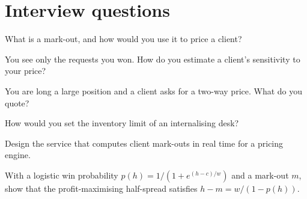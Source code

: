 \section{Interview questions}

\begin{interviewq}\label{iq:s2:flow-market-making-at-a-bank:1}
What is a mark-out, and how would you use it to price a client?
\end{interviewq}

\begin{interviewq}\label{iq:s2:flow-market-making-at-a-bank:2}
You see only the requests you won. How do you estimate a client's sensitivity to your price?
\end{interviewq}

\begin{interviewq}\label{iq:s2:flow-market-making-at-a-bank:3}
You are long a large position and a client asks for a two-way price. What do you quote?
\end{interviewq}

\begin{interviewq}\label{iq:s2:flow-market-making-at-a-bank:4}
How would you set the inventory limit of an internalising desk?
\end{interviewq}

\begin{interviewq}\label{iq:s2:flow-market-making-at-a-bank:5}
Design the service that computes client mark-outs in real time for a pricing engine.
\end{interviewq}

\begin{interviewq}\label{iq:s2:flow-market-making-at-a-bank:6}
With a logistic win probability $p(h) = 1/(1 + e^{(h - c)/w})$ and a mark-out $m$, show that the profit-maximising half-spread satisfies
$h - m = w / (1 - p(h))$.
\end{interviewq}
